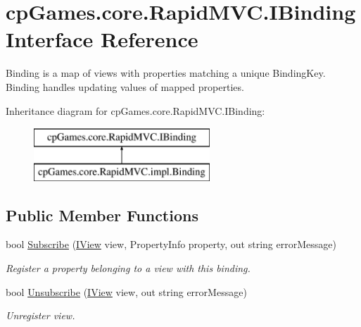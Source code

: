 \hypertarget{interfacecp_games_1_1core_1_1_rapid_m_v_c_1_1_i_binding}{}\section{cp\+Games.\+core.\+Rapid\+M\+V\+C.\+I\+Binding Interface Reference}
\label{interfacecp_games_1_1core_1_1_rapid_m_v_c_1_1_i_binding}


Binding is a map of views with properties matching a unique Binding\+Key. Binding handles updating values of mapped properties.  


Inheritance diagram for cp\+Games.\+core.\+Rapid\+M\+V\+C.\+I\+Binding\+:\begin{figure}[H]
\begin{center}
\leavevmode
\includegraphics[height=2.000000cm]{interfacecp_games_1_1core_1_1_rapid_m_v_c_1_1_i_binding}
\end{center}
\end{figure}
\subsection*{Public Member Functions}
\begin{DoxyCompactItemize}
\item 
bool \mbox{\hyperlink{interfacecp_games_1_1core_1_1_rapid_m_v_c_1_1_i_binding_a6137a570057c5f4cce62ac96d1bb83e2}{Subscribe}} (\mbox{\hyperlink{interfacecp_games_1_1core_1_1_rapid_m_v_c_1_1_i_view}{I\+View}} view, Property\+Info property, out string error\+Message)
\begin{DoxyCompactList}\small\item\em Register a property belonging to a view with this binding. \end{DoxyCompactList}\item 
bool \mbox{\hyperlink{interfacecp_games_1_1core_1_1_rapid_m_v_c_1_1_i_binding_a3b7f2243923ce6e478be289326468cfa}{Unsubscribe}} (\mbox{\hyperlink{interfacecp_games_1_1core_1_1_rapid_m_v_c_1_1_i_view}{I\+View}} view, out string error\+Message)
\begin{DoxyCompactList}\small\item\em Unregister view. \end{DoxyCompactList}\end{DoxyCompactItemize}
